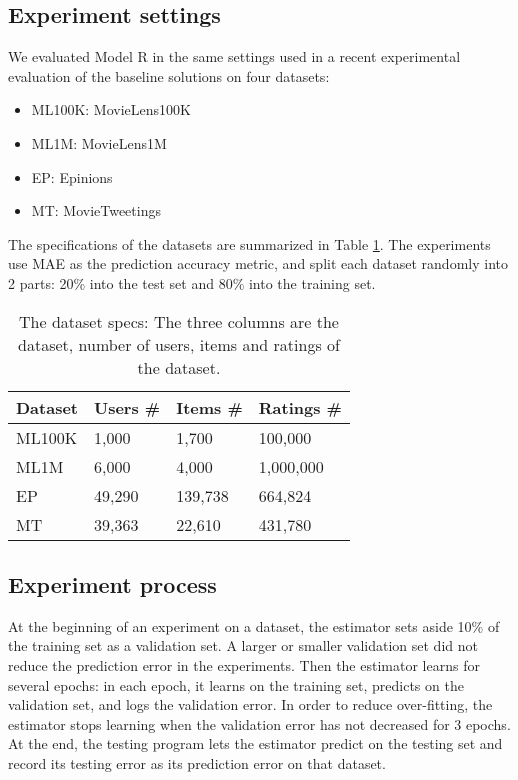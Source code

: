 \documentclass[letterpaper]{article}
\begin{document}
\subsection{Experiment settings}
We evaluated Model R in the same settings used in a recent experimental 
evaluation of the baseline solutions \cite{polatidis2016multi} on four datasets:
\begin{itemize}
	\item ML100K: MovieLens100K\cite{harper2015movielens}
	\item ML1M: MovieLens1M\cite{harper2015movielens}
	\item EP: Epinions \cite{massa2007trust}
	\item MT: MovieTweetings \cite{dooms2013movietweetings}
\end{itemize}
The specifications of the datasets are summarized in Table \ref{tab:dataset}.
The experiments use MAE as the prediction accuracy metric,
and split each dataset randomly into 2 parts: 20\% into the test set and 80\% 
into the training set.
\begin{table}[!htb]
	\centering
	\caption{The dataset specs: 
		The three columns are the dataset, number of users, items and ratings 
		of the dataset.
		}
	\begin{tabularx}{0.47\textwidth}{|X|X|X|X|}  \hline \rowcolor{blue!50}
		Dataset & Users \# & Items \# & Ratings \# \\ \hline
		ML100K  & 1,000   & 1,700   & 100,000 \\ \hline
		ML1M    & 6,000   & 4,000   & 1,000,000 \\ \hline
		EP      & 49,290  & 139,738 & 664,824 \\ \hline
		MT      & 39,363  & 22,610  & 431,780 \\ \hline
	\end{tabularx}
	\label{tab:dataset}
\end{table}

\subsection{Experiment process}
At the beginning of an experiment on a dataset,
the estimator sets aside 10\% of the training set as a validation set.
A larger or smaller validation set did not reduce the prediction error in the 
experiments.
Then the estimator learns for several epochs:
in each epoch,
it learns on the training set,
predicts on the validation set,
and logs the validation error.
In order to reduce over-fitting,
the estimator stops learning when the validation error has not decreased for 3 
epochs.
At the end, the testing program lets the estimator predict on the testing set 
and record its testing error as its prediction error on that dataset.
\end{document}
